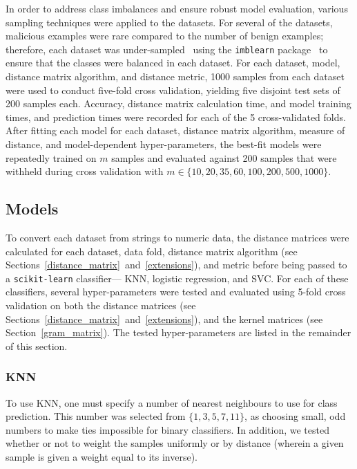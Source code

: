 \documentclass[preprint,12pt]{elsarticle}
\begin{document}
In order to address class imbalances and ensure robust model evaluation, various sampling techniques were applied to the datasets. 
For several of the datasets, malicious examples were rare compared to the number of benign examples; therefore, each dataset was under-sampled~\cite{undersampling} using the \texttt{imblearn} package~\cite{imblearn} to ensure that the classes were balanced in each dataset. 
For each dataset, model, distance matrix algorithm, and distance metric, 1000 samples from each dataset were used to conduct five-fold cross validation, yielding five disjoint test sets of 200 samples each. 
Accuracy, distance matrix calculation time, and model training times, and prediction times were recorded for each of the 5 cross-validated folds.
After fitting each model for each dataset, distance matrix algorithm, measure of distance, and model-dependent hyper-parameters, the best-fit models were repeatedly trained on $m$ samples and evaluated against 200 samples that were withheld during cross validation with $m \in \{ 10, 20, 35, 60, 100, 200, 500, 1000\}$.



\subsection{Models}
\label{models}

To convert each dataset from strings to numeric data, the distance matrices were calculated for each dataset, data fold, distance matrix algorithm (see Sections~\ref{distance_matrix}~and~\ref{extensions}), and metric before being passed to a \texttt{scikit-learn} classifier--- KNN, logistic regression, and SVC. 
For each of these classifiers, several hyper-parameters were tested and evaluated using 5-fold cross validation on both the distance matrices (see Sections~\ref{distance_matrix}~and~\ref{extensions}), and the kernel matrices (see Section~\ref{gram_matrix}). 
The tested hyper-parameters are listed in the remainder of this section.



\subsubsection{KNN}

To use KNN, one must specify a number of nearest neighbours to use for class prediction. This number was selected from $\{1,3,5,7,11\}$, as choosing small, odd numbers to make ties impossible for binary classifiers. In addition, we tested whether or not to weight the samples uniformly or by distance (wherein a given sample is given a weight equal to its inverse). 
\end{document}
